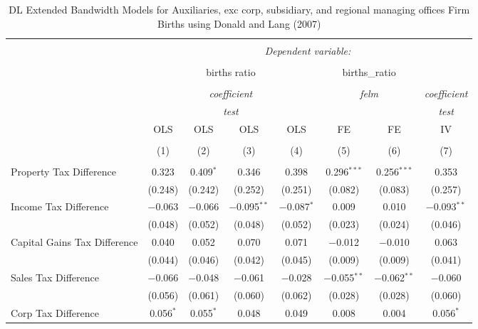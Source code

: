 
\begin{table}[!htbp] \centering 
  \caption{DL Extended Bandwidth Models for  Auxiliaries, exc corp, subsidiary, and regional managing offices Firm Births using Donald and Lang (2007)} 
  \label{} 
\begin{tabular}{@{\extracolsep{5pt}}lccccccc} 
\\[-1.8ex]\hline 
\hline \\[-1.8ex] 
 & \multicolumn{7}{c}{\textit{Dependent variable:}} \\ 
\cline{2-8} 
\\[-1.8ex] & \multicolumn{4}{c}{births ratio} & \multicolumn{2}{c}{births\_ratio} &   \\ 
\\[-1.8ex] & \multicolumn{4}{c}{\textit{coefficient}} & \multicolumn{2}{c}{\textit{felm}} & \textit{coefficient} \\ 
 & \multicolumn{4}{c}{\textit{test}} & \multicolumn{2}{c}{\textit{}} & \textit{test} \\ 
 & OLS & OLS & OLS & OLS & FE & FE & IV \\ 
\\[-1.8ex] & (1) & (2) & (3) & (4) & (5) & (6) & (7)\\ 
\hline \\[-1.8ex] 
 Property Tax Difference & 0.323 & 0.409$^{*}$ & 0.346 & 0.398 & 0.296$^{***}$ & 0.256$^{***}$ & 0.353 \\ 
  & (0.248) & (0.242) & (0.252) & (0.251) & (0.082) & (0.083) & (0.257) \\ 
  Income Tax Difference & $-$0.063 & $-$0.066 & $-$0.095$^{**}$ & $-$0.087$^{*}$ & 0.009 & 0.010 & $-$0.093$^{**}$ \\ 
  & (0.048) & (0.052) & (0.048) & (0.052) & (0.023) & (0.024) & (0.046) \\ 
  Capital Gains Tax Difference & 0.040 & 0.052 & 0.070 & 0.071 & $-$0.012 & $-$0.010 & 0.063 \\ 
  & (0.044) & (0.046) & (0.042) & (0.045) & (0.009) & (0.009) & (0.041) \\ 
  Sales Tax Difference & $-$0.066 & $-$0.048 & $-$0.061 & $-$0.028 & $-$0.055$^{**}$ & $-$0.062$^{**}$ & $-$0.060 \\ 
  & (0.056) & (0.061) & (0.060) & (0.062) & (0.028) & (0.028) & (0.060) \\ 
  Corp Tax Difference & 0.056$^{*}$ & 0.055$^{*}$ & 0.048 & 0.049 & 0.008 & 0.004 & 0.056$^{*}$ \\ 

\end{tabular}
\end{table}

